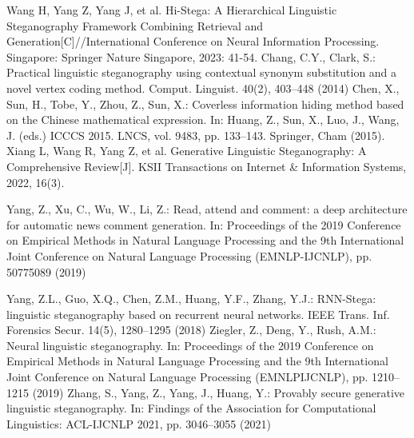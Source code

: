\documentclass[a4paper,11pt,UTF8]{ctexart}
\begin{document}
\newpage
\begin{thebibliography}{100} %

Wang H, Yang Z, Yang J, et al. Hi-Stega: A Hierarchical Linguistic Steganography Framework Combining Retrieval and Generation[C]//International Conference on Neural Information Processing. Singapore: Springer Nature Singapore, 2023: 41-54.
Chang, C.Y., Clark, S.: Practical linguistic steganography using contextual synonym substitution and a novel vertex coding method. Comput. Linguist. 40(2), 403–448 (2014)
Chen, X., Sun, H., Tobe, Y., Zhou, Z., Sun, X.: Coverless information hiding method based on the Chinese mathematical expression. In: Huang, Z., Sun, X., Luo, J., Wang, J. (eds.) ICCCS 2015. LNCS, vol. 9483, pp. 133–143. Springer, Cham (2015).
Xiang L, Wang R, Yang Z, et al. Generative Linguistic Steganography: A Comprehensive Review[J]. KSII Transactions on Internet \& Information Systems, 2022, 16(3). 

Yang, Z., Xu, C., Wu, W., Li, Z.: Read, attend and comment: a deep architecture for automatic news comment generation. In: Proceedings of the 2019 Conference on Empirical Methods in Natural Language Processing and the 9th International Joint Conference on Natural Language Processing (EMNLP-IJCNLP), pp. 50775089 (2019)

Yang, Z.L., Guo, X.Q., Chen, Z.M., Huang, Y.F., Zhang, Y.J.: RNN-Stega: linguistic steganography based on recurrent neural networks. IEEE Trans. Inf. Forensics Secur. 14(5), 1280–1295 (2018)
Ziegler, Z., Deng, Y., Rush, A.M.: Neural linguistic steganography. In: Proceedings of the 2019 Conference on Empirical Methods in Natural Language Processing and the 9th International Joint Conference on Natural Language Processing (EMNLPIJCNLP), pp. 1210–1215 (2019)
Zhang, S., Yang, Z., Yang, J., Huang, Y.: Provably secure generative linguistic steganography. In: Findings of the Association for Computational Linguistics: ACL-IJCNLP 2021, pp. 3046–3055 (2021)
\end{thebibliography}
\end{document}
